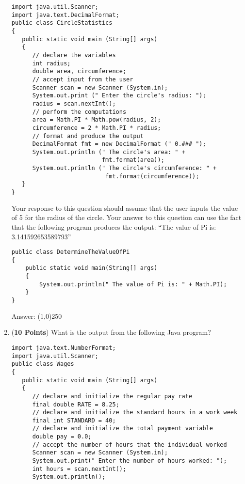 \documentclass[12pt]{article}
\begin{document}
\begin{enumerate}
\hspace*{.25in}
\begin{minipage}{6in}
  \lstset{numbers=left}
  \begin{lstlisting}
import java.util.Scanner;
import java.text.DecimalFormat;
public class CircleStatistics
{
   public static void main (String[] args)
   {
      // declare the variables 
      int radius;
      double area, circumference;
      // accept input from the user
      Scanner scan = new Scanner (System.in);
      System.out.print (" Enter the circle's radius: ");
      radius = scan.nextInt();
      // perform the computations
      area = Math.PI * Math.pow(radius, 2);
      circumference = 2 * Math.PI * radius;
      // format and produce the output
      DecimalFormat fmt = new DecimalFormat (" 0.### ");
      System.out.println (" The circle's area: " + 
                          fmt.format(area));
      System.out.println (" The circle's circumference: " +
                           fmt.format(circumference));
   }
}
  \end{lstlisting}

\end{minipage}

Your response to this question should assume that the user inputs the
value of 5 for the radius of the circle. Your answer to this question
can use the fact that the following program produces the output: ``The
value of Pi is: 3.141592653589793''

\hspace*{.25in}
\begin{minipage}{6in}
  \lstset{numbers=left}
  \begin{lstlisting}
public class DetermineTheValueOfPi	
{
    public static void main(String[] args)
    {
        System.out.println(" The value of Pi is: " + Math.PI);
    }
}
  \end{lstlisting}

\end{minipage}

Answer: \line(1,0){250}

\newpage

\item ({\bf 10 Points}) What is the output from the following Java program?

\hspace*{.25in}
\begin{minipage}{6in}
  \lstset{numbers=left}
  \begin{lstlisting}
import java.text.NumberFormat;
import java.util.Scanner;
public class Wages
{
   public static void main (String[] args)
   {
      // declare and initialize the regular pay rate
      final double RATE = 8.25;  
      // declare and initialize the standard hours in a work week
      final int STANDARD = 40;   
      // declare and initialize the total payment variable 
      double pay = 0.0;
      // accept the number of hours that the individual worked
      Scanner scan = new Scanner (System.in);
      System.out.print(" Enter the number of hours worked: ");
      int hours = scan.nextInt();
      System.out.println();


\end{lstlisting}
\end{minipage}
\end{enumerate}
\end{document}
